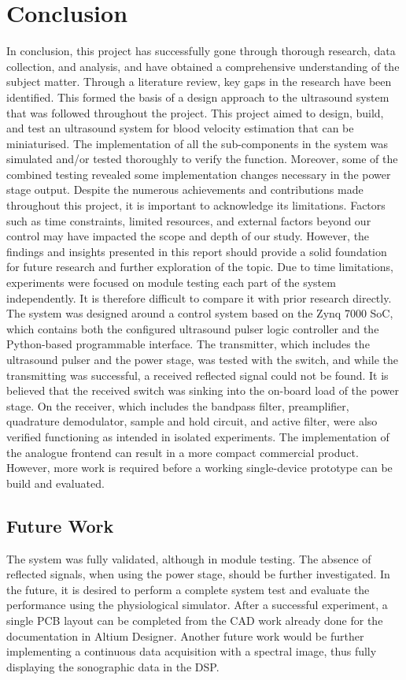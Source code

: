\chapter{Conclusion}
In conclusion, this project has successfully gone through thorough research, data collection, and analysis, and have obtained a comprehensive understanding of the subject matter. Through a literature review, key gaps in the research have been identified. This formed the basis of a design approach to the ultrasound system that was followed throughout the project. This project aimed to design, build, and test an ultrasound system for blood velocity estimation that can be miniaturised. The implementation of all the sub-components in the system was simulated and/or tested thoroughly to verify the function. Moreover, some of the combined testing revealed some implementation changes necessary in the power stage output. Despite the numerous achievements and contributions made throughout this project, it is important to acknowledge its limitations. Factors such as time constraints, limited resources, and external factors beyond our control may have impacted the scope and depth of our study. However, the findings and insights presented in this report should provide a solid foundation for future research and further exploration of the topic. Due to time limitations, experiments were focused on module testing each part of the system independently. It is therefore difficult to compare it with prior research directly. The system was designed around a control system based on the Zynq 7000 SoC, which contains both the configured ultrasound pulser logic controller and the Python-based programmable interface. The transmitter, which includes the ultrasound pulser and the power stage, was tested with the switch, and while the transmitting was successful, a received reflected signal could not be found. It is believed that the received switch was sinking into the on-board load of the power stage.  On the receiver, which includes the bandpass filter, preamplifier, quadrature demodulator, sample and hold circuit, and active filter, were also verified functioning as intended in isolated experiments. The implementation of the analogue frontend can result in a more compact commercial product. However, more work is required before a working single-device prototype can be build and evaluated.
\section{Future Work}
The system was fully validated, although in module testing. The absence of reflected signals, when using the  power stage, should be further investigated. In the future, it is desired to perform a complete system test and evaluate the performance using the physiological simulator. After a successful experiment, a single PCB layout can be completed from the CAD work already done for the documentation in Altium Designer. Another future work would be further implementing a continuous data acquisition with a spectral image, thus fully displaying the sonographic data in the DSP.